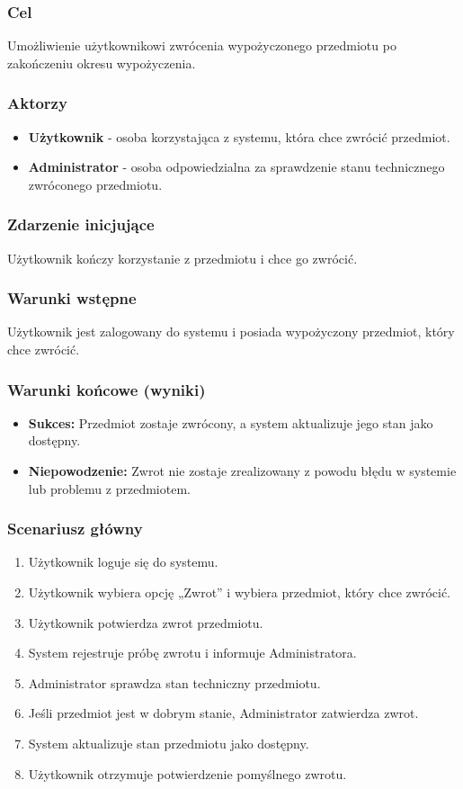 \documentclass{article}
\begin{document}
\subsubsection{Cel}
Umożliwienie użytkownikowi zwrócenia wypożyczonego przedmiotu po zakończeniu okresu wypożyczenia.

\subsubsection{Aktorzy}
\begin{itemize}
    \item \textbf{Użytkownik} - osoba korzystająca z systemu, która chce zwrócić przedmiot.
    \item \textbf{Administrator} - osoba odpowiedzialna za sprawdzenie stanu technicznego zwróconego przedmiotu.
\end{itemize}

\subsubsection{Zdarzenie inicjujące}
Użytkownik kończy korzystanie z przedmiotu i chce go zwrócić.

\subsubsection{Warunki wstępne}
Użytkownik jest zalogowany do systemu i posiada wypożyczony przedmiot, który chce zwrócić.

\subsubsection{Warunki końcowe (wyniki)}
\begin{itemize}
    \item \textbf{Sukces:} Przedmiot zostaje zwrócony, a system aktualizuje jego stan jako dostępny.
    \item \textbf{Niepowodzenie:} Zwrot nie zostaje zrealizowany z powodu błędu w systemie lub problemu z przedmiotem.
\end{itemize}

\subsubsection{Scenariusz główny}
\begin{enumerate}
    \item Użytkownik loguje się do systemu.
    \item Użytkownik wybiera opcję „Zwrot” i wybiera przedmiot, który chce zwrócić.
    \item Użytkownik potwierdza zwrot przedmiotu.
    \item System rejestruje próbę zwrotu i informuje Administratora.
    \item Administrator sprawdza stan techniczny przedmiotu.
    \item Jeśli przedmiot jest w dobrym stanie, Administrator zatwierdza zwrot.
    \item System aktualizuje stan przedmiotu jako dostępny.
    \item Użytkownik otrzymuje potwierdzenie pomyślnego zwrotu.
\end{enumerate}
\end{document}
